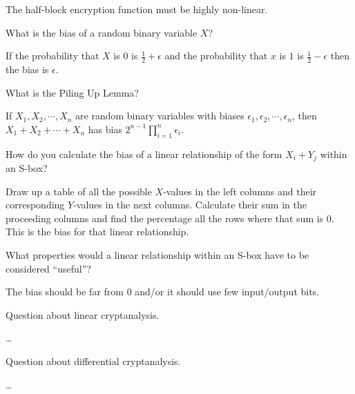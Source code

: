 \documentclass{article}
\newcounter{qcounter}
\newcommand{\showqcounter}{\theqcounter}
\newcommand{\question}{\vspace{5mm}\addtocounter{qcounter}{1}\vspace{5mm}{\bf Q\showqcounter: }}
\newcommand{\answer}{\vspace{5mm}{\bf A\showqcounter: }}
\begin{document}
\answer The half-block encryption function must be highly non-linear.


\question What is the bias of a random binary variable $X$?

\answer If the probability that $X$ is $0$ is $\frac{1}{2} + \epsilon$ and the probability that $x$ is $1$ is $\frac{1}{2} - \epsilon$ then 
  the bias is $\epsilon$.


\question What is the Piling Up Lemma?

\answer If $X_1, X_2, \cdots, X_n$ are random binary variables with biases $\epsilon_1, \epsilon_2, \cdots, \epsilon_n$, then 
  $X_1 + X_2 + \cdots + X_n$ has bias $2^{n - 1} \prod_{i = 1}^n \epsilon_i$.


\question How do you calculate the bias of a linear relationship of the form $X_i + Y_j$ within an S-box?

\answer Draw up a table of all the possible $X$-values in the left columns and their corresponding $Y$-values in the next columns.
  Calculate their sum in the proceeding columns and find the percentage all the rows where that sum is $0$. This is the bias for that 
  linear relationship.


\question What properties would a linear relationship within an S-box have to be considered ``useful''?

\answer The bias should be far from $0$ and/or it should use few input/output bits.


\question Question about linear cryptanalysis.

\answer \dots


\question Question about differential cryptanalysis.

\answer \dots
\end{document}
